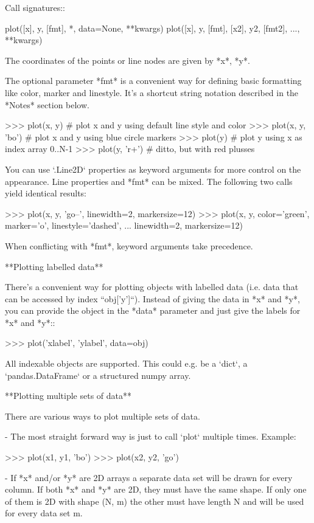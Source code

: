 \begin{DoxyVerb}
\begin{DoxyVerb}
Call signatures::

    plot([x], y, [fmt], *, data=None, **kwargs)
    plot([x], y, [fmt], [x2], y2, [fmt2], ..., **kwargs)

The coordinates of the points or line nodes are given by *x*, *y*.

The optional parameter *fmt* is a convenient way for defining basic
formatting like color, marker and linestyle. It's a shortcut string
notation described in the *Notes* section below.

>>> plot(x, y)        # plot x and y using default line style and color
>>> plot(x, y, 'bo')  # plot x and y using blue circle markers
>>> plot(y)           # plot y using x as index array 0..N-1
>>> plot(y, 'r+')     # ditto, but with red plusses

You can use `.Line2D` properties as keyword arguments for more
control on the appearance. Line properties and *fmt* can be mixed.
The following two calls yield identical results:

>>> plot(x, y, 'go--', linewidth=2, markersize=12)
>>> plot(x, y, color='green', marker='o', linestyle='dashed',
...      linewidth=2, markersize=12)

When conflicting with *fmt*, keyword arguments take precedence.


**Plotting labelled data**

There's a convenient way for plotting objects with labelled data (i.e.
data that can be accessed by index ``obj['y']``). Instead of giving
the data in *x* and *y*, you can provide the object in the *data*
parameter and just give the labels for *x* and *y*::

>>> plot('xlabel', 'ylabel', data=obj)

All indexable objects are supported. This could e.g. be a `dict`, a
`pandas.DataFrame` or a structured numpy array.


**Plotting multiple sets of data**

There are various ways to plot multiple sets of data.

- The most straight forward way is just to call `plot` multiple times.
  Example:

  >>> plot(x1, y1, 'bo')
  >>> plot(x2, y2, 'go')

- If *x* and/or *y* are 2D arrays a separate data set will be drawn
  for every column. If both *x* and *y* are 2D, they must have the
  same shape. If only one of them is 2D with shape (N, m) the other
  must have length N and will be used for every data set m.


\end{DoxyVerb}
\end{DoxyVerb}
